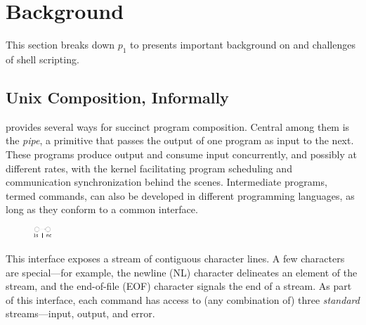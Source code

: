 \documentclass[sigplan,10pt,review,anonymous]{acmart}
\begin{document}

% 

\section{Background}
\label{bg}

This section breaks down $p_1$ to presents important background on and challenges
of shell scripting.

\subsection{Unix Composition, Informally}
\label{bg:pipelines}

\unix provides several ways for succinct program composition.
Central among them is the \emph{pipe}, a primitive that passes the output of one program as input to the next.
These programs produce output and consume input concurrently, and possibly at different rates, with the \unix kernel facilitating program scheduling and communication synchronization behind the scenes.
Intermediate programs, termed commands, can also be developed in different programming languages, as long as they conform to a common interface.
\begin{figure}
  \vspace{-12pt}
    \includegraphics[width=0.06\textwidth]{./figs/dish_ex1.pdf}
  \vspace{-30pt}
\end{figure}
This interface exposes a stream of contiguous character lines.
A few characters are special---for example, the newline (\textsc{NL}) character delineates an element of the stream, and the end-of-file (\textsc{EOF}) character signals the end of a stream.
As part of this interface, each command has access to (any combination of) three \emph{standard} streams---input, output, and error.
\end{document}
